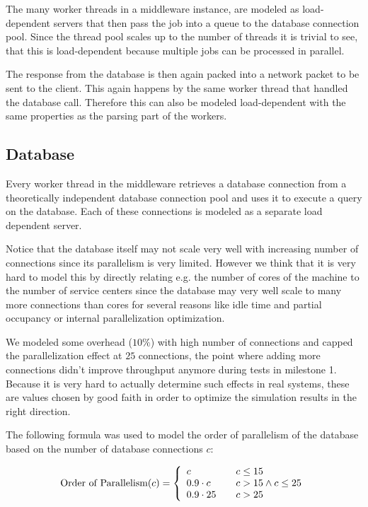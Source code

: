 \documentclass[a4paper, oneside]{csthesis}
\begin{document}
    The many worker threads in a \telesto{} middleware instance, are modeled as
    load-dependent servers that then pass the job into a queue to the database
    connection pool. Since the thread pool scales up to the number of threads it
    is trivial to see, that this is load-dependent because multiple jobs can be
    processed in parallel.
    
    The response from the database is then again packed into a \telesto{}
    network packet to be sent to the client. This again happens by the same
    worker thread that handled the database call. Therefore this can also be
    modeled load-dependent with the same properties as the parsing part of the
    workers.
    
\subsection{Database}
    Every worker thread in the middleware retrieves a database connection from
    a theoretically independent database connection pool and uses it to execute
    a query on the database. Each of these connections is modeled as a separate
    load dependent server.
    
    Notice that the database itself may not scale very well with increasing
    number of connections since its parallelism is very limited. However we
    think that it is very hard to model this by directly relating e.g. the
    number of cores of the machine to the number of service centers since the
    database may very well scale to many more connections than cores for several
    reasons like idle time and partial occupancy or internal parallelization
    optimization. 
    
    We modeled some overhead ($10\%$) with high number of connections and capped
    the parallelization effect at $25$ connections, the point where adding more
    connections didn't improve throughput anymore during tests in milestone 1.
    Because it is very hard to actually determine such effects in real systems,
    these are values chosen by good faith in order to optimize the simulation
    results in the right direction.
    
    The following formula was used to model the order of parallelism of the
    database based on the number of database connections $c$:
    
    \[ 
    \text{Order of Parallelism}(c) = \left\{ 
      \begin{array}{l l}
        c                   & \quad c \leq 15               \\
        0.9 \cdot c         & \quad c > 15 \land c \leq 25   \\
        0.9 \cdot 25        & \quad c > 25
      \end{array} \right.
    \]
        
\end{document}
